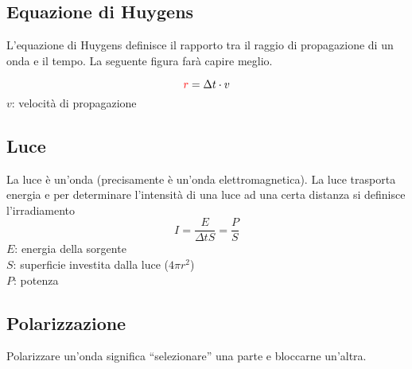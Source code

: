 \subsection{Equazione di Huygens}
L'equazione di Huygens definisce il rapporto tra il raggio di propagazione di un onda e il tempo.
La seguente figura farà capire meglio.

\begin{center}
\end{center}
\begin{equation*}
  \mathcolor{red}{r} = \Delta t\cdot v
\end{equation*}
$v$: velocità di propagazione

\subsection{Luce}
La luce è un'onda (precisamente è un'onda elettromagnetica). La luce trasporta energia e per 
determinare l'intensità di una luce ad una certa distanza si definisce l'irradiamento
\begin{equation*}
  I = \frac{E}{\Delta tS} = \frac{P}{S}
\end{equation*}
$E$: energia della sorgente\\
$S$: superficie investita dalla luce ($4\pi r^2$)\\
$P$: potenza


\subsection{Polarizzazione}
Polarizzare un'onda significa ``selezionare'' una parte e bloccarne un'altra.
